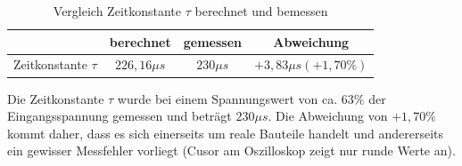 \documentclass[12pt,a4paper,titlepage]{article}
\begin{document}
\begin{table}[H]
  \centering
  \begin{tabular}{|c|c|c|c|}
  \hline
                     & berechnet    & gemessen    & Abweichung \\ \hline
  Zeitkonstante $\tau$ & $226,16 \mu s$    & $230 \mu s$      & $+3,83 \mu s(+1,70 \%)$ \\ \hline
  \end{tabular}
  \caption{Vergleich Zeitkonstante $\tau$ berechnet und bemessen}
  \label{Figure03}
\end{table}
\noindent Die Zeitkonstante $\tau$ wurde bei einem Spannungswert von ca. $63 \%$ der Eingangsspannung gemessen und betr\"agt $230 \mu s$. Die Abweichung von $+1,70 \%$ kommt daher, dass es sich einerseits um reale Bauteile handelt und andererseits ein gewisser Messfehler vorliegt (Cusor am Oszilloskop zeigt nur runde Werte an).
\end{document}
